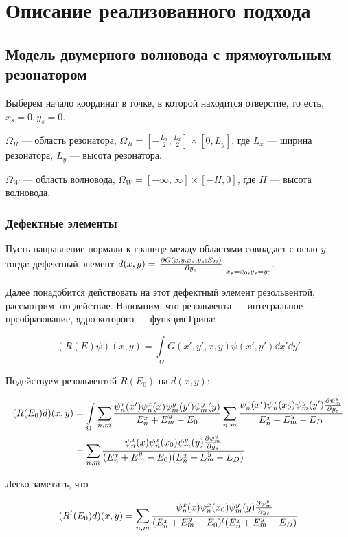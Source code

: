 \chapter{Описание реализованного подхода}
\label{chapter2}

\section{Модель двумерного волновода с прямоугольным резонатором}

Выберем начало координат в точке, в которой находится отверстие, то есть, $x_s = 0, y_s = 0$.

$\Omega_R$ — область резонатора, $\Omega_R = [- \frac{L_x}{2}, \frac{L_x}{2}] \times [0, L_y]$, где $L_x$ — ширина резонатора, $L_y$ — высота резонатора.

$\Omega_W$ — область волновода, $\Omega_W = [-\infty, \infty] \times [-H, 0]$, где $H$ — высота волновода.

\subsection{Дефектные элементы}Пусть направление нормали к границе между областями совпадает с осью $y$, тогда: дефектный элемент $d(x, y) = \eval{\pdv{G(x, y, x_s, y_s; E_D)}{y_s}}_{x_s = x_0, y_s = y_0}$.

Далее понадобится действовать на этот дефектный элемент резольвентой, рассмотрим это действие. Напомним, что резольвента — интегральное преобразование, ядро которого — функция Грина:

$$(R(E) \psi)(x, y) = \int\limits_\Omega G(x', y', x, y) \psi(x', y') \dd{x'} \dd{y'}$$

Подействуем резольвентой $R(E_0)$ на $d(x, y)$:

\begin{align*}
(R(E_0) d)(x, y)
&= \int\limits_\Omega \sum\limits_{n, m} \frac{\psi^x_n(x') \psi^x_n(x) \psi^y_m(y') \psi^y_m(y)}{E^x_n + E^y_m - E_0} \sum\limits_{n, m} \frac{\psi_n^x(x') \psi_n^x(x_0) \psi_m^y(y') \pdv{\psi_m^y}{y_s} (y_0)}{E^x_n + E^y_m - E_D} \\
&= \sum\limits_{n, m} \frac{\psi_n^x(x) \psi_n^x(x_0) \psi_m^y(y) \pdv{\psi_m^y}{y_s} (y_0)}{(E^x_n + E^y_m - E_0)(E^x_n + E^y_m - E_D)} \\
\end{align*}

Легко заметить, что 

\[
(R^t(E_0) d)(x, y)
= \sum\limits_{n, m} \frac{\psi_n^x(x) \psi_n^x(x_0) \psi_m^y(y) \pdv{\psi_m^y}{y_s} (y_0)}{(E^x_n + E^y_m - E_0)^t(E^x_n + E^y_m - E_D)}
\]

